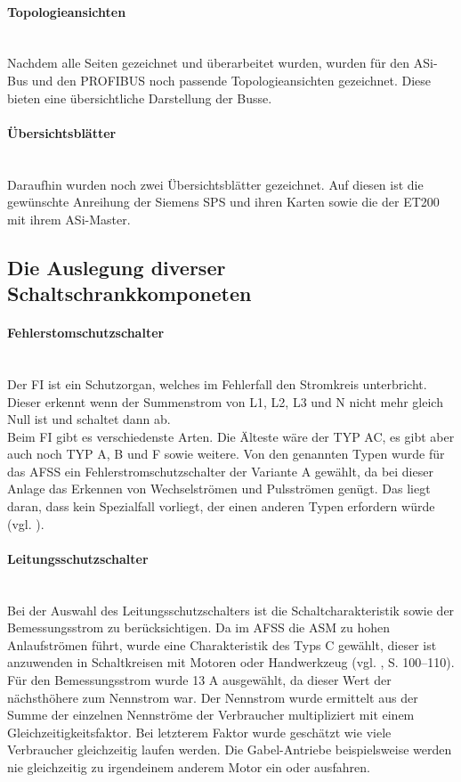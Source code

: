     \paragraph{Topologieansichten}\mbox{}\\
    Nachdem alle Seiten gezeichnet und überarbeitet wurden, wurden für den ASi-Bus und den PROFIBUS noch passende Topologieansichten gezeichnet. Diese bieten eine übersichtliche Darstellung der Busse.
    \paragraph{Übersichtsblätter}\mbox{}\\
    Daraufhin wurden noch zwei Übersichtsblätter gezeichnet. Auf diesen ist die gewünschte Anreihung der Siemens SPS und ihren Karten sowie die der ET200 mit ihrem ASi-Master.
\subsection{Die Auslegung diverser Schaltschrankkomponeten}
    \paragraph{Fehlerstomschutzschalter}\mbox{}\\
    Der FI ist ein Schutzorgan, welches im Fehlerfall den Stromkreis unterbricht. Dieser erkennt wenn der Summenstrom von L1, L2, L3 und N nicht mehr gleich Null ist und schaltet dann ab.\\
    Beim FI gibt es verschiedenste Arten. Die Älteste wäre der TYP AC, es gibt aber auch noch TYP A, B und F sowie weitere. Von den genannten Typen wurde für das AFSS ein Fehlerstromschutzschalter der Variante A gewählt, da bei dieser Anlage das Erkennen von Wechselströmen und Pulsströmen genügt. Das liegt daran, dass kein Spezialfall vorliegt, der einen anderen Typen erfordern würde (vgl. \cite{FI-Typen}).
    \paragraph{Leitungsschutzschalter}\mbox{}\\
    Bei der Auswahl des Leitungsschutzschalters ist die Schaltcharakteristik sowie der Bemessungsstrom zu berücksichtigen. Da im AFSS die ASM zu hohen Anlaufströmen führt, wurde eine Charakteristik des Typs C gewählt, dieser ist anzuwenden in Schaltkreisen mit Motoren oder Handwerkzeug (vgl. \cite{SeyrRösch}, S. 100–110). Für den Bemessungsstrom wurde 13 A ausgewählt, da dieser Wert der nächsthöhere zum Nennstrom war. Der Nennstrom wurde ermittelt aus der Summe der einzelnen Nennströme der Verbraucher multipliziert mit einem Gleichzeitigkeitsfaktor. Bei letzterem Faktor wurde geschätzt wie viele Verbraucher gleichzeitig laufen werden. Die Gabel-Antriebe beispielsweise werden nie gleichzeitig zu irgendeinem anderem Motor ein oder ausfahren. 
